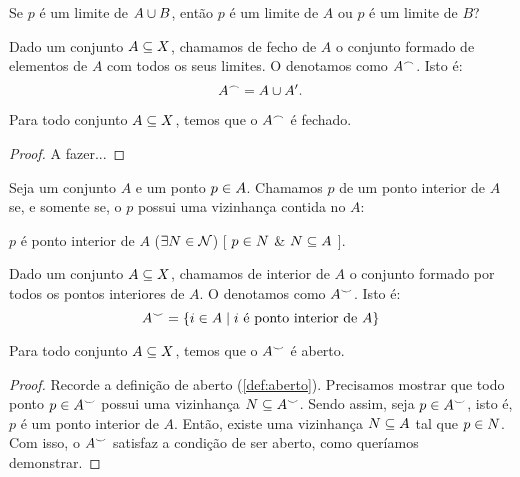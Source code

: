 \begin{question}
	Se $p$ é um limite de $A \cup B$, então $p$ é um limite de $A$ ou $p$ é um limite de $B$?
\end{question}

\begin{definition}
	Dado um conjunto $A \subseteq X$, chamamos de fecho de $A$ o conjunto formado de elementos de $A$ com todos os seus limites. O denotamos como $A^{\frown}$. Isto é:
	\[
		A^{\frown} = A \cup A^{\prime}.
	\]
\end{definition}

\begin{theorem}
	Para todo conjunto $A \subseteq X$, temos que o $A^{\frown}$ é fechado.
\end{theorem}

\begin{proof}
	A fazer...
\end{proof}

\begin{definition}
	Seja um conjunto $A$ e um ponto $p \in A$. Chamamos $p$ de um ponto interior de $A$ se, e somente se, o $p$ possui uma vizinhança contida no $A$:
	\begin{center}
		$p$ é ponto interior de $A$ \sse
			($\exists N \in \mathcal{N}$)%
			[ $p \in N$ \& $N \subseteq A$ ].
	\end{center}
\end{definition}

\begin{definition}
	Dado um conjunto $A \subseteq X$, chamamos de interior de $A$ o conjunto formado por todos os pontos interiores de $A$. O denotamos como $A^{\smile}$. Isto é:
	\[
		A^{\smile} = \left\{ i \in A \mid \text{$i$ é ponto interior de $A$} \right\}
	\]
\end{definition}

\begin{theorem}
	Para todo conjunto $A \subseteq X$, temos que o $A^{\smile}$ é aberto.
\end{theorem}

\begin{proof}
	Recorde a definição de aberto (\ref{def:aberto}). Precisamos mostrar que todo ponto $p \in A^{\smile}$ possui uma vizinhança $N \subseteq A^{\smile}$. Sendo assim, seja $p \in A^{\smile}$, isto é, $p$ é um ponto interior de $A$. Então, existe uma vizinhança $N \subseteq A$ tal que $p \in N$. Com isso, o $A^{\smile}$ satisfaz a condição de ser aberto, como queríamos demonstrar.
\end{proof}

